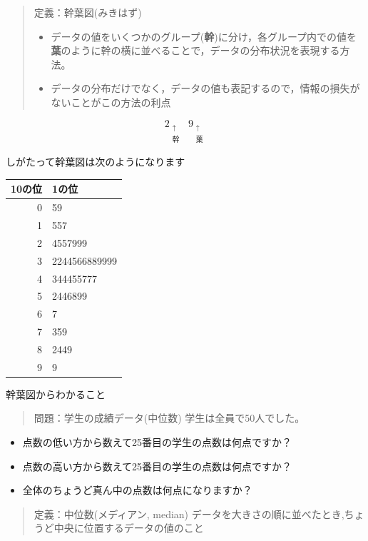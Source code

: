 \documentclass[
]{book}
\providecommand{\tightlist}{%
  \setlength{\itemsep}{0pt}\setlength{\parskip}{0pt}}
\theoremstyle{definition}
\theoremstyle{definition}
\theoremstyle{definition}
\theoremstyle{definition}
\theoremstyle{remark}
\begin{document}
\begin{quote}
定義：幹葉図(みきはず)

\begin{itemize}
\tightlist
\item
  データの値をいくつかのグループ(\textbf{幹})に分け，各グループ内での値を\textbf{葉}のように幹の横に並べることで，データの分布状況を表現する方法。
\item
  データの分布だけでなく，データの値も表記するので，情報の損失がないことがこの方法の利点
\end{itemize}
\end{quote}

\[
\mathop{2}_{\substack{\uparrow \\ \text{幹}}}
\mathop{9}_{\substack{\uparrow \\ \text{葉}}}
\]

しがたって幹葉図は次のようになります

\begin{longtable}[]{@{}rl@{}}
\toprule()
10の位 & 1の位 \\
\midrule()
\endhead
0 & 59 \\
1 & 557 \\
2 & 4557999 \\
3 & 2244566889999 \\
4 & 344455777 \\
5 & 2446899 \\
6 & 7 \\
7 & 359 \\
8 & 2449 \\
9 & 9 \\
\bottomrule()
\end{longtable}

幹葉図からわかること

\begin{quote}
問題：学生の成績データ(中位数)
学生は全員で50人でした。
\end{quote}

\begin{itemize}
\tightlist
\item
  点数の低い方から数えて25番目の学生の点数は何点ですか？
\item
  点数の高い方から数えて25番目の学生の点数は何点ですか？
\item
  全体のちょうど真ん中の点数は何点になりますか？
\end{itemize}

\begin{quote}
定義：中位数(メディアン, median)
データを大きさの順に並べたとき,ちょうど中央に位置するデータの値のこと
\end{quote}
\end{document}
